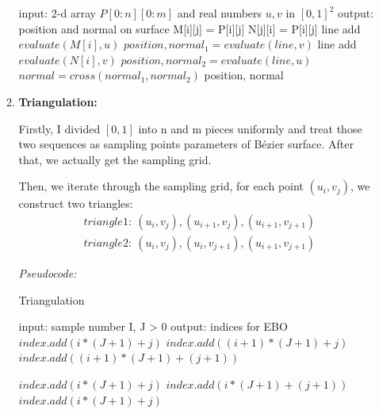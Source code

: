 \documentclass[acmtog]{acmart}
\begin{document}
\begin{enumerate}
\begin{enumerate}
\begin{algorithm}
\begin{algorithmic}
				\STATE input: 2-d array $P[0:n][0:m]$ and real numbers $u,v$ in $[0,1]^2$
				\STATE output: position and normal on surface
						\STATE M[i][j] = P[i][j]
						\STATE N[j][i] = P[i][j]
					\ENDFOR
				\ENDFOR
					\STATE line add $evaluate(M[i],u)$
				\ENDFOR
				\STATE $position, normal_1 = evaluate(line, v)$
					\STATE line add $evaluate(N[i],v)$
				\ENDFOR
				\STATE $position, normal_2 = evaluate(line, u)$
				\STATE $normal = cross(normal_1, normal_2)$
				\RETURN position, normal
			\end{algorithmic} 
		\end{algorithm}
		\item {\bf Triangulation:}
		\par Firstly, I divided $[0,1]$ into n and m pieces uniformly and treat those two sequences as sampling points parameters of Bézier surface. After that, we actually get the sampling grid.
		\par Then, we iterate through the sampling grid, for each point $(u_i, v_j)$, we construct two triangles:
		\begin{align*}
			triangle1:\ (u_i,v_j), (u_{i+1}, v_{j}), (u_{i+1}, v_{j+1})\\
			triangle2:\ (u_i,v_j), (u_{i}, v_{j+1}), (u_{i+1}, v_{j+1})
		\end{align*}
		\par {\it Pseudocode:}
		\begin{algorithm}[H]
			\caption{Triangulation} 
			\begin{algorithmic}
				\STATE input: sample number I, J > 0
				\STATE output: indices for EBO
						\STATE $index.add(i * (J + 1) + j)$
						\STATE $index.add((i + 1) * (J + 1) + j)$
						\STATE $index.add((i + 1) * (J + 1) + (j + 1))$
						
						\STATE $index.add(i * (J + 1) + j)$
						\STATE $index.add(i * (J + 1) + (j + 1))$
						\STATE $index.add(i * (J + 1) + j)$
					\ENDFOR
				\ENDFOR
				

\end{algorithmic}
\end{algorithm}
\end{enumerate}
\end{enumerate}
\end{document}
